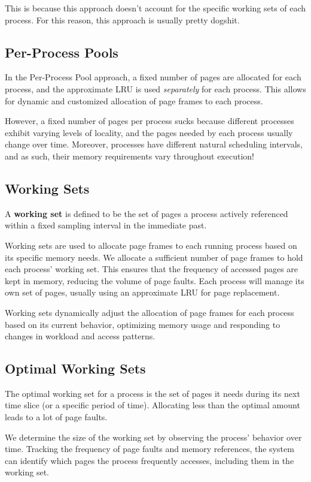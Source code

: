 \documentclass{report}
\newcommand{\definitionBegin}[1]{\begin{tcolorbox}[title={Definition: #1}]}
\newcommand{\definitionEnd}{\end{tcolorbox}}
\begin{document}
This is because this approach doesn't account for the specific working sets of each process. For
this reason, this approach is usually pretty dogshit.


\subsection{Per-Process Pools}
In the Per-Process Pool approach, a fixed number of pages are allocated for each process, and the
approximate LRU is used \textit{separately} for each process. This allows for dynamic and customized
allocation of page frames to each process.

However, a fixed number of pages per process sucks because different processes exhibit varying
levels of locality, and the pages needed by each process usually change over time. Moreover,
processes have different natural scheduling intervals, and as such, their memory requirements vary
throughout execution!


\subsection{Working Sets}
\definitionBegin{Working Set}
A \textbf{working set} is defined to be the set of pages a process actively referenced within a
fixed sampling interval in the immediate past.
\definitionEnd

Working sets are used to allocate page frames to each running process based on its specific memory
needs. We allocate a sufficient number of page frames to hold each process' working set. This
ensures that the frequency of accessed pages are kept in memory, reducing the volume of page
faults. Each process will manage its own set of pages, usually using an approximate LRU for page
replacement. 

Working sets dynamically adjust the allocation of page frames for each process based on its current
behavior, optimizing memory usage and responding to changes in workload and access patterns.


\subsection*{Optimal Working Sets}
The optimal working set for a process is the set of pages it needs during its next time slice (or a
specific period of time). Allocating less than the optimal amount leads to a lot of page faults.

We determine the size of the working set by observing the process' behavior over time. Tracking the
frequency of page faults and memory references, the system can identify which pages the process
frequently accesses, including them in the working set.
\end{document}
